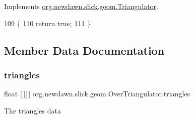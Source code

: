 Implements \mbox{\hyperlink{interfaceorg_1_1newdawn_1_1slick_1_1geom_1_1_triangulator_a7c7ce8f59679b6c759a1e3d15ec4ee92}{org.\+newdawn.\+slick.\+geom.\+Triangulator}}.


\begin{DoxyCode}
109                                  \{
110         \textcolor{keywordflow}{return} \textcolor{keyword}{true};
111     \}
\end{DoxyCode}


\subsection{Member Data Documentation}
\mbox{\label{classorg_1_1newdawn_1_1slick_1_1geom_1_1_over_triangulator_a81f4d764fe0327ce4cd6692e777cc5f6}} 
\subsubsection{\texorpdfstring{triangles}{triangles}}
{\footnotesize\ttfamily float \mbox{[}$\,$\mbox{]}\mbox{[}$\,$\mbox{]} org.\+newdawn.\+slick.\+geom.\+Over\+Triangulator.\+triangles\hspace{0.3cm}{\ttfamily [private]}}

The triangles data 